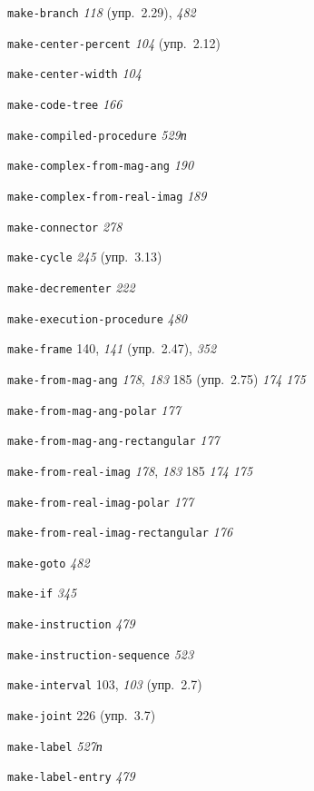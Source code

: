 \begin{theindex}
\item {\texttt{make-branch}} {\it 118} (упр.~2.29), {\it 482}
\item {\texttt{make-center-percent}} {\it 104} (упр.~2.12)
\item {\texttt{make-center-width}} {\it 104}
\item {\texttt{make-code-tree}} {\it 166}
\item {\texttt{make-compiled-procedure}} {\it 529}{\it п}
\item {\texttt{make-complex-from-mag-ang}} {\it 190}
\item {\texttt{make-complex-from-real-imag}} {\it 189}
\item {\texttt{make-connector}} {\it 278}
\item {\texttt{make-cycle}} {\it 245} (упр.~3.13)
\item {\texttt{make-decrementer}} {\it 222}
\item {\texttt{make-execution-procedure}} {\it 480}
\item {\texttt{make-frame}} 140, {\it 141} (упр.~2.47), {\it 352}
\item {\texttt{make-from-mag-ang}} {\it 178}, {\it 183}
   185 (упр.~2.75)
   {\it 174}
   {\it 175}
\item {\texttt{make-from-mag-ang-polar}} {\it 177}
\item {\texttt{make-from-mag-ang-rectangular}} {\it 177}
\item {\texttt{make-from-real-imag}} {\it 178}, {\it 183}
   185
   {\it 174}
   {\it 175}
\item {\texttt{make-from-real-imag-polar}} {\it 177}
\item {\texttt{make-from-real-imag-rectangular}} {\it 176}
\item {\texttt{make-goto}} {\it 482}
\item {\texttt{make-if}} {\it 345}
\item {\texttt{make-instruction}} {\it 479}
\item {\texttt{make-instruction-sequence}} {\it 523}
\item {\texttt{make-interval}} 103, {\it 103} (упр.~2.7)
\item {\texttt{make-joint}} 226 (упр.~3.7)
\item {\texttt{make-label}} {\it 527}{\it п}
\item {\texttt{make-label-entry}} {\it 479}

\end{theindex}
